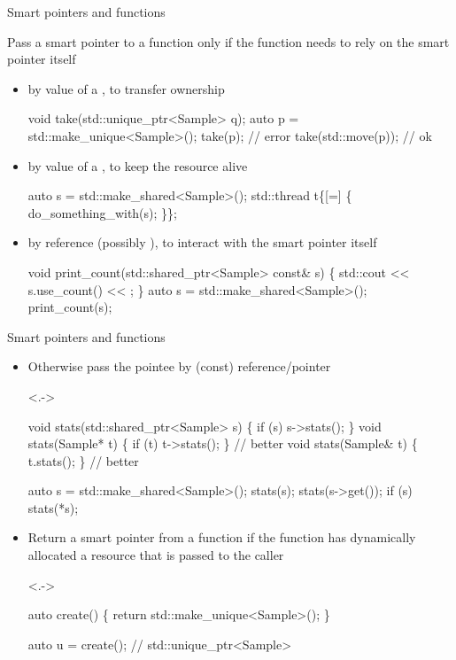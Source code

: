 \begin{frame}[fragile]{Smart pointers and functions}

  Pass a smart pointer to a function only if the function needs to rely on the
  smart pointer itself

  \begin{itemize}

  \item<2-> by value of a , to transfer ownership
    \begin{codeblock}
void take(std::unique_ptr<Sample> q);
auto p = std::make_unique<Sample>();
take(p);            // error
take(std::move(p)); // ok\end{codeblock}

\item<3-> by value of a , to keep the resource alive
  \begin{codeblock}
auto s = std::make_shared<Sample>();
std::thread t\{[=] \{ do_something_with(s); \}\};\end{codeblock}

\item<4-> by reference (possibly ), to interact with the smart
  pointer itself
  \begin{codeblock}
void print_count(std::shared_ptr<Sample> const& s) \{
  std::cout << s.use_count() << \bslashn{};
\}
auto s = std::make_shared<Sample>();
print_count(s);\end{codeblock}

  \end{itemize}

\end{frame}

\begin{frame}[fragile]{Smart pointers and functions \insertcontinuationtext}
  \begin{itemize}[<+->]
  \item Otherwise pass the pointee by (const) reference/pointer
    \begin{codeblock}<.->{
void stats(std::shared_ptr<Sample> s) \{ if (s) s->stats(); \}
void stats(Sample* t)                 \{ if (t) t->stats(); \} // better
void stats(Sample& t)                 \{ t.stats(); \}         // better

auto s = std::make_shared<Sample>();
stats(s);
stats(s->get());
if (s) stats(*s);}\end{codeblock}

  \item Return a smart pointer from a function if the function
    has dynamically allocated a resource that is passed to the caller

    \begin{codeblock}<.->{
auto create() \{ return std::make_unique<Sample>(); \}

auto u = create();     // std::unique_ptr<Sample>

}\end{codeblock}

  \end{itemize}

\end{frame}

